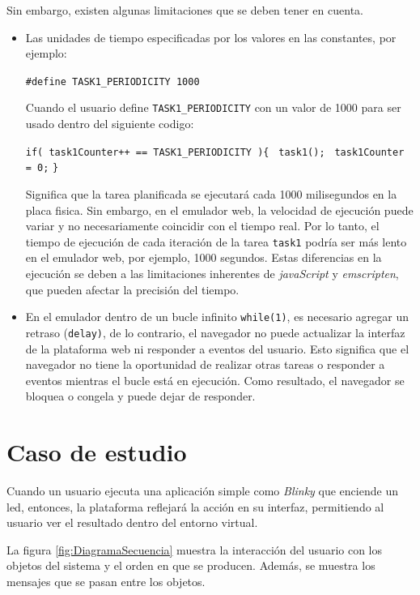 Sin embargo, existen algunas limitaciones que se deben tener en cuenta.

\begin{itemize}
	\item Las unidades de tiempo especificadas por los valores en las constantes, por ejemplo: 
	
\texttt{\#define TASK1\_PERIODICITY 1000} 

Cuando el usuario define \texttt{TASK1\_PERIODICITY} con un valor de 1000 para ser usado dentro del siguiente codigo:

\texttt{if( task1Counter++ == TASK1\_PERIODICITY )\{\newline} 
\texttt{  task1();}{\newline} 
\texttt{  task1Counter = 0;}{\newline} 
\texttt{\}}

Significa que la tarea  planificada se ejecutará cada 1000 milisegundos en la placa fisica. Sin embargo, en el emulador web, la velocidad de ejecución puede variar y no necesariamente coincidir con el tiempo real. Por lo tanto, el tiempo de ejecución de cada iteración de la tarea \texttt{task1} podría ser más lento en el emulador web, por ejemplo, 1000 segundos. Estas diferencias en la ejecución se deben a las limitaciones inherentes de \textit{javaScript} y \textit{emscripten}, que pueden afectar la precisión del tiempo.


	\item En el emulador dentro de un bucle infinito \texttt{while(1)}, es necesario agregar un retraso (\texttt{delay)}, de lo contrario, el navegador no puede actualizar la interfaz de la plataforma web ni responder a eventos del usuario. Esto significa que el navegador no tiene la oportunidad de realizar otras tareas o responder a eventos mientras el bucle está en ejecución. Como resultado, el navegador se bloquea o congela y puede dejar de responder.
	
\end{itemize}


\section{Caso de estudio}

Cuando un usuario ejecuta una aplicación simple como \textit{Blinky} que enciende un led, entonces, la plataforma reflejará la acción en su interfaz, permitiendo al usuario ver el resultado dentro del entorno virtual.


La figura \ref{fig:DiagramaSecuencia} muestra la interacción del usuario con los objetos del sistema y el orden en que se producen. Además, se muestra los mensajes que se pasan entre los objetos.


